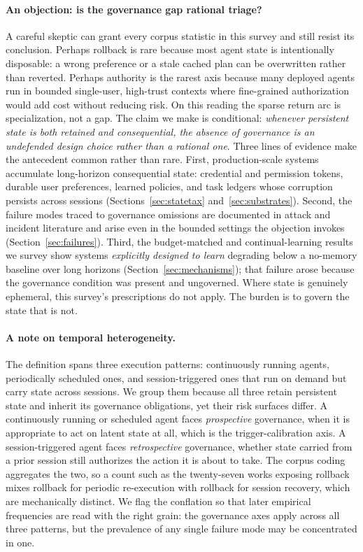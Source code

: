 \paragraph{An objection: is the governance gap rational triage?} A careful skeptic can grant every corpus statistic in this survey and still resist its conclusion. Perhaps rollback is rare because most agent state is intentionally disposable: a wrong preference or a stale cached plan can be overwritten rather than reverted. Perhaps authority is the rarest axis because many deployed agents run in bounded single-user, high-trust contexts where fine-grained authorization would add cost without reducing risk. On this reading the sparse return arc is specialization, not a gap. The claim we make is conditional: \emph{whenever persistent state is both retained and consequential, the absence of governance is an undefended design choice rather than a rational one}. Three lines of evidence make the antecedent common rather than rare. First, production-scale systems accumulate long-horizon consequential state: credential and permission tokens, durable user preferences, learned policies, and task ledgers whose corruption persists across sessions (Sections~\ref{sec:statetax} and~\ref{sec:substrates}). Second, the failure modes traced to governance omissions are documented in attack and incident literature and arise even in the bounded settings the objection invokes (Section~\ref{sec:failures}). Third, the budget-matched and continual-learning results we survey show systems \emph{explicitly designed to learn} degrading below a no-memory baseline over long horizons (Section~\ref{sec:mechanisms}); that failure arose because the governance condition was present and ungoverned. Where state is genuinely ephemeral, this survey's prescriptions do not apply. The burden is to govern the state that is not.

\paragraph{A note on temporal heterogeneity.} The definition spans three execution patterns: continuously running agents, periodically scheduled ones, and session-triggered ones that run on demand but carry state across sessions. We group them because all three retain persistent state and inherit its governance obligations, yet their risk surfaces differ. A continuously running or scheduled agent faces \emph{prospective} governance, when it is appropriate to act on latent state at all, which is the trigger-calibration axis. A session-triggered agent faces \emph{retrospective} governance, whether state carried from a prior session still authorizes the action it is about to take. The corpus coding aggregates the two, so a count such as the twenty-seven works exposing rollback mixes rollback for periodic re-execution with rollback for session recovery, which are mechanically distinct. We flag the conflation so that later empirical frequencies are read with the right grain: the governance axes apply across all three patterns, but the prevalence of any single failure mode may be concentrated in one.

